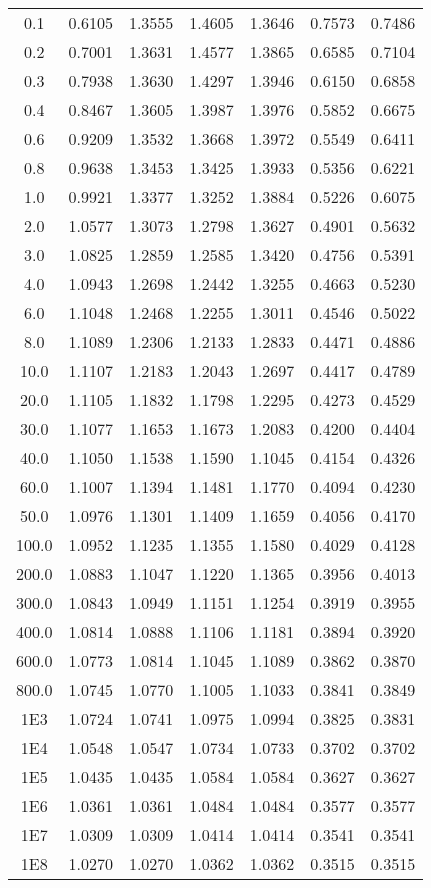 \documentclass[12pt]{article}
\begin{document}
\begin{tabular}{ccccccc}
  0.1 & 0.6105 & 1.3555 & 1.4605 & 1.3646 & 0.7573 & 0.7486 \\ 
  0.2 & 0.7001 & 1.3631 & 1.4577 & 1.3865 & 0.6585 & 0.7104 \\ 
  0.3 & 0.7938 & 1.3630 & 1.4297 & 1.3946 & 0.6150 & 0.6858 \\ 
  0.4 & 0.8467 & 1.3605 & 1.3987 & 1.3976 & 0.5852 & 0.6675 \\ 
  0.6 & 0.9209 & 1.3532 & 1.3668 & 1.3972 & 0.5549 & 0.6411 \\ 
  0.8 & 0.9638 & 1.3453 & 1.3425 & 1.3933 & 0.5356 & 0.6221 \\ 
  1.0 & 0.9921 & 1.3377 & 1.3252 & 1.3884 & 0.5226 & 0.6075 \\ 
  2.0 & 1.0577 & 1.3073 & 1.2798 & 1.3627 & 0.4901 & 0.5632 \\ 
  3.0 & 1.0825 & 1.2859 & 1.2585 & 1.3420 & 0.4756 & 0.5391 \\ 
  4.0 & 1.0943 & 1.2698 & 1.2442 & 1.3255 & 0.4663 & 0.5230 \\ 
  6.0 & 1.1048 & 1.2468 & 1.2255 & 1.3011 & 0.4546 & 0.5022 \\ 
  8.0 & 1.1089 & 1.2306 & 1.2133 & 1.2833 & 0.4471 & 0.4886 \\ 
 10.0 & 1.1107 & 1.2183 & 1.2043 & 1.2697 & 0.4417 & 0.4789 \\ 
 20.0 & 1.1105 & 1.1832 & 1.1798 & 1.2295 & 0.4273 & 0.4529 \\ 
 30.0 & 1.1077 & 1.1653 & 1.1673 & 1.2083 & 0.4200 & 0.4404 \\ 
 40.0 & 1.1050 & 1.1538 & 1.1590 & 1.1045 & 0.4154 & 0.4326 \\ 
 60.0 & 1.1007 & 1.1394 & 1.1481 & 1.1770 & 0.4094 & 0.4230 \\ 
 50.0 & 1.0976 & 1.1301 & 1.1409 & 1.1659 & 0.4056 & 0.4170 \\ 
100.0 & 1.0952 & 1.1235 & 1.1355 & 1.1580 & 0.4029 & 0.4128 \\ 
200.0 & 1.0883 & 1.1047 & 1.1220 & 1.1365 & 0.3956 & 0.4013 \\ 
300.0 & 1.0843 & 1.0949 & 1.1151 & 1.1254 & 0.3919 & 0.3955 \\ 
400.0 & 1.0814 & 1.0888 & 1.1106 & 1.1181 & 0.3894 & 0.3920 \\ 
600.0 & 1.0773 & 1.0814 & 1.1045 & 1.1089 & 0.3862 & 0.3870 \\ 
800.0 & 1.0745 & 1.0770 & 1.1005 & 1.1033 & 0.3841 & 0.3849 \\ 
  1E3 & 1.0724 & 1.0741 & 1.0975 & 1.0994 & 0.3825 & 0.3831 \\ 
  1E4 & 1.0548 & 1.0547 & 1.0734 & 1.0733 & 0.3702 & 0.3702 \\ 
  1E5 & 1.0435 & 1.0435 & 1.0584 & 1.0584 & 0.3627 & 0.3627 \\ 
  1E6 & 1.0361 & 1.0361 & 1.0484 & 1.0484 & 0.3577 & 0.3577 \\ 
  1E7 & 1.0309 & 1.0309 & 1.0414 & 1.0414 & 0.3541 & 0.3541 \\ 
  1E8 & 1.0270 & 1.0270 & 1.0362 & 1.0362 & 0.3515 & 0.3515 
\end{tabular}
\end{document}
